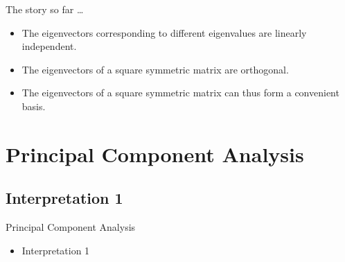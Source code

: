 \documentclass[10pt, aspectratio=169]{beamer}
\begin{document}
\begin{frame}
\begin{block}{The story so far \ldots}

\begin{itemize}

\item<1-> The eigenvectors corresponding to different eigenvalues are linearly independent.

\item<2-> The eigenvectors of a square symmetric matrix are orthogonal.

\item<3-> The eigenvectors of a square symmetric matrix can thus form a convenient basis.

\end{itemize}

\end{block}

\end{frame}


\section{Principal Component Analysis}

\subsection{Interpretation 1}
\begin{frame}{Principal Component Analysis}
\begin{itemize}
\item Interpretation 1
\end{itemize}
\end{frame}
\end{document}
